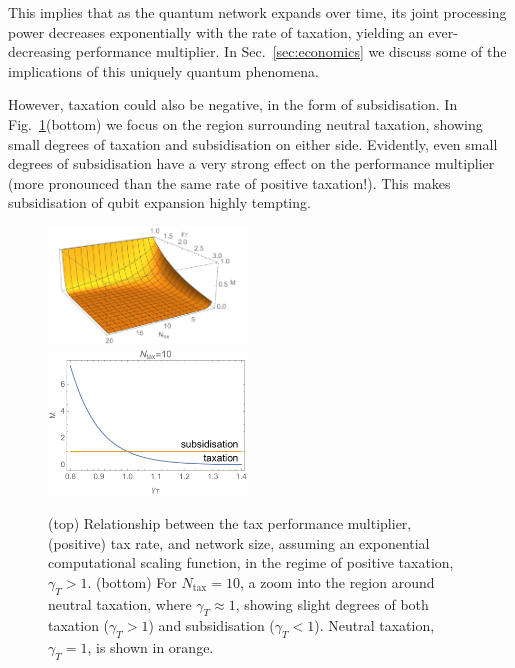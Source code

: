 This implies that as the quantum network expands over time, its joint processing power decreases exponentially with the rate of taxation, yielding an ever-decreasing performance multiplier. In Sec.~\ref{sec:economics} we discuss some of the implications of this uniquely quantum phenomena.

However, taxation could also be negative, in the form of subsidisation. In Fig.~\ref{fig:tax_exp}(bottom) we focus on the region surrounding neutral taxation, showing small degrees of taxation and subsidisation on either side. Evidently, even small degrees of subsidisation have a very strong effect on the performance multiplier (more pronounced than the same rate of positive taxation!). This makes subsidisation of qubit expansion highly tempting.

\begin{figure}[!htb]
\includegraphics[width=0.47\textwidth]{tax_exp} \\
\includegraphics[width=0.47\textwidth]{tax_subsidy}
\caption{(top) Relationship between the tax performance multiplier, (positive) tax rate, and network size, assuming an exponential computational scaling function, in the regime of positive taxation, \mbox{$\gamma_T>1$}. (bottom) For \mbox{$N_\text{tax}=10$}, a zoom into the region around neutral taxation, where \mbox{$\gamma_T\approx 1$}, showing slight degrees of both taxation (\mbox{$\gamma_T>1$}) and subsidisation (\mbox{$\gamma_T<1$}). Neutral taxation, \mbox{$\gamma_T=1$}, is shown in orange.}\label{fig:tax_exp}
\end{figure}

%
%

